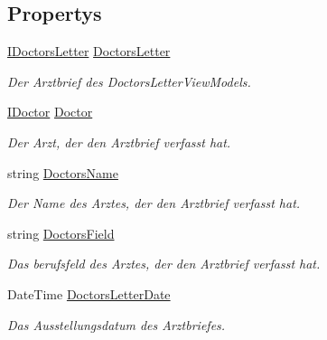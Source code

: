 \subsection*{Propertys}
\begin{DoxyCompactItemize}
\item 
\mbox{\hyperlink{interfacemy_m_d_1_1_model_interface_1_1_data_model_interface_1_1_i_doctors_letter}{I\+Doctors\+Letter}} \mbox{\hyperlink{classmy_m_d_1_1_view_model_1_1_overview_tab_view_model_1_1_doctors_letter_view_model_a7fc91581b93d169c2a2891431b18c00a}{Doctors\+Letter}}
\begin{DoxyCompactList}\small\item\em Der Arztbrief des Doctors\+Letter\+View\+Models. \end{DoxyCompactList}\item 
\mbox{\hyperlink{interfacemy_m_d_1_1_model_interface_1_1_data_model_interface_1_1_i_doctor}{I\+Doctor}} \mbox{\hyperlink{classmy_m_d_1_1_view_model_1_1_overview_tab_view_model_1_1_doctors_letter_view_model_a7198d58577b1ff6afb311d7f6d2ec135}{Doctor}}
\begin{DoxyCompactList}\small\item\em Der Arzt, der den Arztbrief verfasst hat. \end{DoxyCompactList}\item 
string \mbox{\hyperlink{classmy_m_d_1_1_view_model_1_1_overview_tab_view_model_1_1_doctors_letter_view_model_aba4a1943b0af5de34cd998194f88d746}{Doctors\+Name}}
\begin{DoxyCompactList}\small\item\em Der Name des Arztes, der den Arztbrief verfasst hat. \end{DoxyCompactList}\item 
string \mbox{\hyperlink{classmy_m_d_1_1_view_model_1_1_overview_tab_view_model_1_1_doctors_letter_view_model_aa4fc2a27c4bf91ec2024f5d27e70e662}{Doctors\+Field}}
\begin{DoxyCompactList}\small\item\em Das berufsfeld des Arztes, der den Arztbrief verfasst hat. \end{DoxyCompactList}\item 
Date\+Time \mbox{\hyperlink{classmy_m_d_1_1_view_model_1_1_overview_tab_view_model_1_1_doctors_letter_view_model_ae83d2cfdf45b0fabb044b90d9388064d}{Doctors\+Letter\+Date}}
\begin{DoxyCompactList}\small\item\em Das Ausstellungsdatum des Arztbriefes. \end{DoxyCompactList}\end{DoxyCompactItemize}
